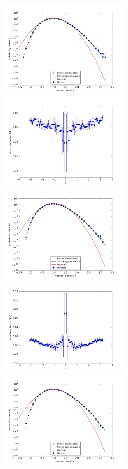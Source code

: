 \documentclass{article}
\begin{document}
\begin{figure}
\begin{center}
\end{center}
\includegraphics[width=0.5\linewidth,height=1.9in]{fig1/appendix_exp_diff_dt0.1_hist_mid1.jpg}
\includegraphics[width=0.5\linewidth,height=1.9in]{fig1/appendix_exp_diff_dt0.1_Sk_mid1.jpg}
\includegraphics[width=0.5\linewidth,height=1.9in]{fig1/appendix_exp_diff_dt0.1_hist_mid2.jpg}
\includegraphics[width=0.5\linewidth,height=1.9in]{fig1/appendix_exp_diff_dt0.1_Sk_mid2.jpg}
\includegraphics[width=0.5\linewidth,height=1.9in]{fig1/appendix_exp_diff_dt0.1_hist_mid3.jpg}

\end{figure}
\end{document}
